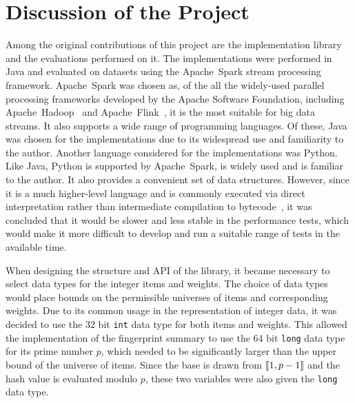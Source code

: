 \chapter{Discussion of the Project}
\label{ch:discussion}

Among the original contributions of this project are the implementation library and the evaluations performed on it.
The implementations were performed in Java and evaluated on datasets using the Apache~Spark stream processing framework.
Apache~Spark was chosen as, of the all the widely-used parallel processing frameworks developed by the Apache Software Foundation, including Apache~Hadoop~\citep{tasf06} and Apache~Flink~\citep{tasf11}, it is the most suitable for big data streams.
It also supports a wide range of programming languages.
Of these, Java was chosen for the implementations due to its widespread use and familiarity to the author.
Another language considered for the implementations was Python.
Like Java, Python is supported by Apache~Spark, is widely used and is familiar to the author.
It also provides a convenient set of data structures.
However, since it is a much higher-level language and is commonly executed via direct interpretation rather than intermediate compilation to bytecode~\citep{psf91}, it was concluded that it would be slower and less stable in the performance tests, which would make it more difficult to develop and run a suitable range of tests in the available time.

When designing the structure and API of the library, it became necessary to select data types for the integer items and weights.
The choice of data types would place bounds on the permissible universes of items and corresponding weights.
Due to its common usage in the representation of integer data, it was decided to use the 32 bit \lstinline{int} data type for both items and weights.
This allowed the implementation of the fingerprint summary to use the 64 bit \lstinline{long} data type for its prime number \( p \), which needed to be significantly larger than the upper bound of the universe of items.
Since the base is drawn from \( \llbracket1, p - 1\rrbracket \) and the hash value is evaluated modulo \( p \), these two variables were also given the \lstinline{long} data type.

